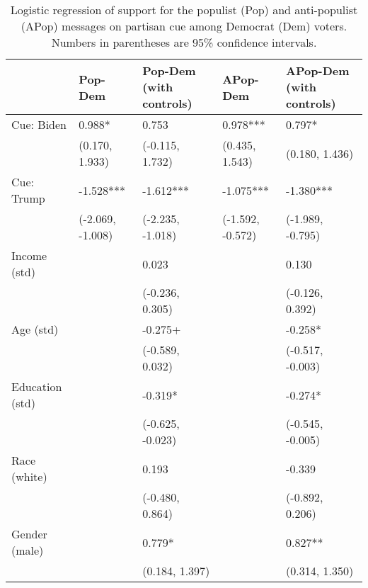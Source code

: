 \begin{table}[th!]
\centering
\caption{Logistic regression of support for the populist (Pop) and anti-populist (APop) messages on partisan cue among Democrat (Dem) voters. Numbers in parentheses are 95\% confidence intervals.}
\label{tab-reg-dem.tex}
\begin{threeparttable}
\begin{tabular}{lC{2.7cm}C{2.7cm}C{2.7cm}C{2.7cm}}
\toprule
                &          Pop-Dem & Pop-Dem (with controls) &         APop-Dem & APop-Dem (with controls) \\
\midrule
     Cue: Biden &           0.988* &                   0.753 &         0.978*** &                   0.797* \\
                &   (0.170, 1.933) &         (-0.115, 1.732) &   (0.435, 1.543) &           (0.180, 1.436) \\
     Cue: Trump &        -1.528*** &               -1.612*** &        -1.075*** &                -1.380*** \\
                & (-2.069, -1.008) &        (-2.235, -1.018) & (-1.592, -0.572) &         (-1.989, -0.795) \\
   Income (std) &                  &                   0.023 &                  &                    0.130 \\
                &                  &         (-0.236, 0.305) &                  &          (-0.126, 0.392) \\
      Age (std) &                  &                 -0.275+ &                  &                  -0.258* \\
                &                  &         (-0.589, 0.032) &                  &         (-0.517, -0.003) \\
Education (std) &                  &                 -0.319* &                  &                  -0.274* \\
                &                  &        (-0.625, -0.023) &                  &         (-0.545, -0.005) \\
   Race (white) &                  &                   0.193 &                  &                   -0.339 \\
                &                  &         (-0.480, 0.864) &                  &          (-0.892, 0.206) \\
  Gender (male) &                  &                  0.779* &                  &                  0.827** \\
                &                  &          (0.184, 1.397) &                  &           (0.314, 1.350) \\

\end{tabular}
\end{threeparttable}
\end{table}
